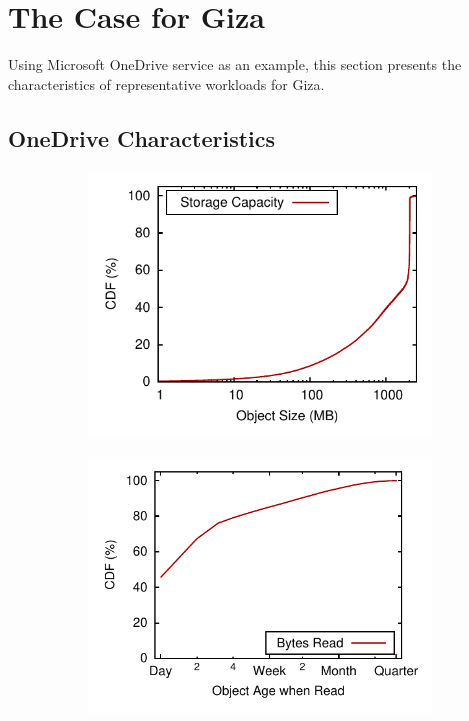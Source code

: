 \section{The Case for Giza}
\label{sec:motivation}

Using Microsoft OneDrive service as an example, this section presents the characteristics of representative workloads for Giza.

\subsection{OneDrive Characteristics}

\begin{figure}[tp]
\hspace{-3em}
\begin{subfigure}{.3\textwidth}
  \centering
  \includegraphics[width=\linewidth]{data/object_size-storage_capacity}
  \caption{}
  \label{fig:object_size-storage_capacity}
\end{subfigure}%
\begin{subfigure}{.3\textwidth}
  \centering
  \includegraphics[width=\linewidth]{data/write_read_gap-bytes_read}

\end{subfigure}
\end{figure}
